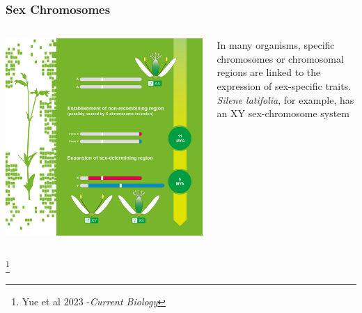 \documentclass{beamer}
\newcommand\blfootnote[1]{%
	\begingroup
	\renewcommand\thefootnote{}\footnote{#1}%
	\addtocounter{footnote}{-1}%
	\endgroup
}
\begin{document}
\begin{frame}
	\frametitle{Sex Chromosomes}
	\begin{columns}
		\begin{column}{0.7\textwidth}
				\includegraphics[keepaspectratio, width  =\textwidth]{img/sileneSexChroms}
		\end{column}
		\begin{column}{0.3\textwidth}
				\small In many organisms, specific chromosomes or chromosomal regions are linked to the expression of sex-specific traits.\\
				\vspace{20pt}
				\small  \textit{Silene latifolia}, for example, has an XY sex-chromosome system
				
				
			\end{column}
	\end{columns}
\blfootnote{Yue et al 2023 -\textit{Current Biology}}
\end{frame}
	
\end{document}
